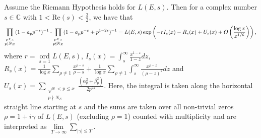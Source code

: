 \documentclass[10pt,a4paper]{amsart}
\newcommand{\ord}{\mathop{\mathrm{ord}}}
\renewcommand{\Re}{\mathrm{Re}}
\begin{document}
\begin{theorem} \label{mainthm} 
Assume the Riemann Hypothesis holds for $L(E, s)$. Then for a complex number $s \in \mathbb C$ with $1< \Re(s)< \frac{3}{2}$,  we have that 
\begin{equation*}
\prod_ {\substack{p \leq x \\ p | N_E}}(1-a_pp^{-s})^{-1} \cdot  \prod_ {\substack{p \leq x \\ p \nmid N_E}} (1-a_pp^{-s}+p^{1-2s})^{-1}  = L(E, s)  \exp \left (-r I_s(x) - R_s(x) 
+  U_s(x)+ O \left ( \frac{\log x}{x^{1/6}} \right ) \right),  \\
\end{equation*}
where $r=\ord \limits _{s=1} L(E, s)$,  $\displaystyle I_s(x)= \int_{s}^{\infty} \frac{x^{1-z}}{1-z} dz$,  $
\displaystyle R_s(x) = \frac{1}{\log x} \sum \limits_{ \rho \neq 1 } \frac{x^{\rho-s}}{ \rho-s}+ \frac{1}{ \log x} \sum \limits_{\rho \neq 1} \int_{s}^{\infty} \frac{x^{\rho-z}}{(\rho-z)^2}dz$ and  $ \displaystyle U_s(x)= \sum_{\substack{\sqrt x < p \leq x \\ p \nmid  N_E}} \frac{(\alpha_p^2+\beta_p^2) }{2p^{2s}} $. Here, the integral is taken along the horizontal straight line starting at $s$ and the sums are taken over all non-trivial zeros $\rho=1+i \gamma$ of $L(E, s)$ (excluding $\rho=1$) counted with multiplicity and are interpreted as $\lim \limits _{T \to \infty} \sum \limits _{ |\gamma| \leq T}$. 
\end{theorem}
\end{document}
